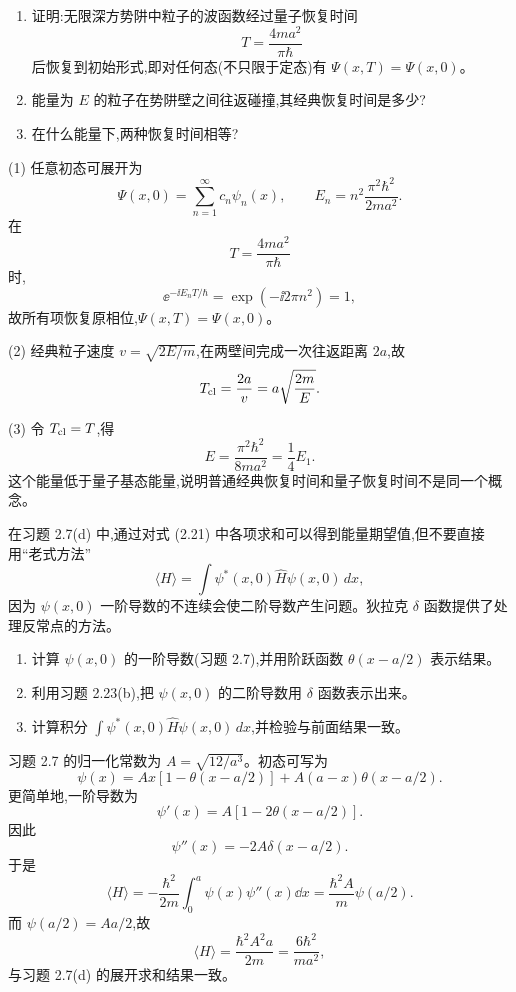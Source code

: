 \begin{question}
\begin{enumerate}
\item 证明:无限深方势阱中粒子的波函数经过量子恢复时间
\[
T=\frac{4ma^2}{\pi\hbar}
\]
后恢复到初始形式,即对任何态(不只限于定态)有 $\Psi(x,T)=\Psi(x,0)$。
\item 能量为 $E$ 的粒子在势阱壁之间往返碰撞,其经典恢复时间是多少?
\item 在什么能量下,两种恢复时间相等?
\end{enumerate}
\end{question}
\begin{solution}
(1) 任意初态可展开为
\[
\Psi(x,0)=\sum_{n=1}^{\infty}c_n\psi_n(x),
\qquad
E_n=n^2\frac{\pi^2\hbar^2}{2ma^2}.
\]
在
\[
T=\frac{4ma^2}{\pi\hbar}
\]
时,
\[
\ee^{-\ii E_nT/\hbar}=\exp(-\ii 2\pi n^2)=1,
\]
故所有项恢复原相位,$\Psi(x,T)=\Psi(x,0)$。

(2) 经典粒子速度 $v=\sqrt{2E/m}$,在两壁间完成一次往返距离 $2a$,故
\[
T_{\rm cl}=\frac{2a}{v}=a\sqrt{\frac{2m}{E}}.
\]

(3) 令 $T_{\rm cl}=T$,得
\[
E=\frac{\pi^2\hbar^2}{8ma^2}=\frac14E_1.
\]
这个能量低于量子基态能量,说明普通经典恢复时间和量子恢复时间不是同一个概念。
\end{solution}

\begin{question}
在习题 2.7(d) 中,通过对式 (2.21) 中各项求和可以得到能量期望值,但不要直接用“老式方法”
\[
\langle H\rangle=\int \psi^*(x,0)\hat H\psi(x,0)\,dx,
\]
因为 $\psi(x,0)$ 一阶导数的不连续会使二阶导数产生问题。狄拉克 $\delta$ 函数提供了处理反常点的方法。
\begin{enumerate}
\item 计算 $\psi(x,0)$ 的一阶导数(习题 2.7),并用阶跃函数 $\theta(x-a/2)$ 表示结果。
\item 利用习题 2.23(b),把 $\psi(x,0)$ 的二阶导数用 $\delta$ 函数表示出来。
\item 计算积分 $\int\psi^*(x,0)\hat H\psi(x,0)\,dx$,并检验与前面结果一致。
\end{enumerate}

\par\smallskip
{}

\end{question}
\begin{solution}
习题 2.7 的归一化常数为 $A=\sqrt{12/a^3}$。初态可写为
\[
\psi(x)=Ax[1-\theta(x-a/2)]+A(a-x)\theta(x-a/2).
\]
更简单地,一阶导数为
\[
\psi'(x)=A\left[1-2\theta(x-a/2)\right].
\]
因此
\[
\psi''(x)=-2A\delta(x-a/2).
\]
于是
\[
\langle H\rangle=-\frac{\hbar^2}{2m}\int_0^a\psi(x)\psi''(x)\dd x
=\frac{\hbar^2A}{m}\psi(a/2).
\]
而 $\psi(a/2)=Aa/2$,故
\[
\langle H\rangle=\frac{\hbar^2A^2a}{2m}
=\frac{6\hbar^2}{ma^2},
\]
与习题 2.7(d) 的展开求和结果一致。
\end{solution}


